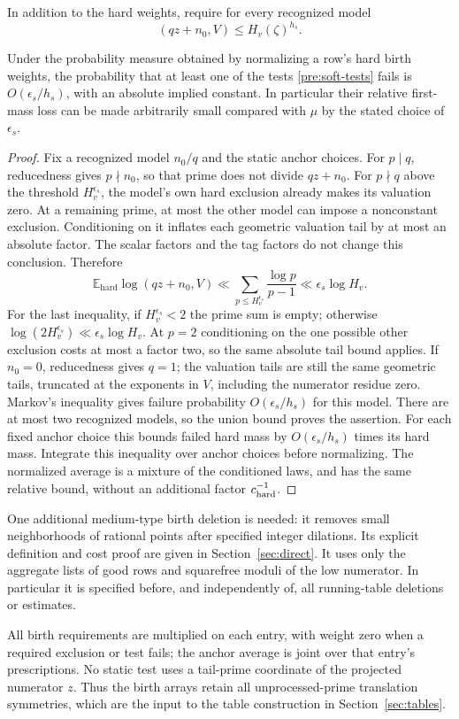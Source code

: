 In addition to the hard weights, require for every recognized model
\begin{equation}
 (qz+n_0,V)\le H_v(\zeta)^{h_s}.
 \label{pre:soft-tests}
\end{equation}

\begin{lemma}
\label{pre:soft-loss}
Under the probability measure obtained by normalizing a row's
hard birth weights, the probability that at least one of the tests
\eqref{pre:soft-tests} fails is $O(\epsilon_s/h_s)$, with an absolute
implied constant. In particular their relative first-mass loss can
be made arbitrarily small compared with $\mu$ by the stated
choice of $\epsilon_s$.
\end{lemma}

\begin{proof}
Fix a recognized model $n_0/q$ and the static anchor choices.
For $p\mid q$, reducedness gives $p\nmid n_0$, so that prime does
not divide $qz+n_0$. For $p\nmid q$ above the threshold
$H_v^{\epsilon_s}$, the model's own hard exclusion already makes
its valuation zero. At a remaining prime, at most the other
model can impose a nonconstant exclusion. Conditioning on it
inflates each geometric valuation tail by at most an absolute
factor. The scalar factors and the tag factors do not change
this conclusion. Therefore
\[
 \mathbb E_{\mathrm{hard}}\log(qz+n_0,V)
 \ll\sum_{p\le H_v^{\epsilon_s}}\frac{\log p}{p-1}
\ll\epsilon_s\log H_v.
\]
For the last inequality, if $H_v^{\epsilon_s}<2$ the prime sum
is empty; otherwise $\log(2H_v^{\epsilon_s})\ll
\epsilon_s\log H_v$. At $p=2$ conditioning on the one possible
other exclusion costs at most a factor two, so the same absolute
tail bound applies. If $n_0=0$, reducedness gives $q=1$; the
valuation tails are still the same geometric tails, truncated at
the exponents in $V$, including the numerator residue zero.
Markov's inequality gives failure probability
$O(\epsilon_s/h_s)$ for this model. There are at most two
recognized models, so the union bound proves the assertion.
For each fixed anchor choice this bounds failed hard mass by
$O(\epsilon_s/h_s)$ times its hard mass. Integrate this inequality
over anchor choices before normalizing. The normalized average
is a mixture of the conditioned laws, and has the same relative
bound, without an additional factor $c_{\rm hard}^{-1}$.
\end{proof}

One additional medium-type birth deletion is needed: it removes
small neighborhoods of rational points after specified integer
dilations. Its explicit definition and cost proof are given in
Section~\ref{sec:direct}. It uses only the aggregate lists of good
rows and squarefree moduli of the low numerator. In particular it
is specified before, and independently of, all running-table
deletions or estimates.

All birth requirements are multiplied on each entry, with weight
zero when a required exclusion or test fails; the anchor average
is joint over that entry's prescriptions. No static test uses a
tail-prime coordinate of the projected numerator $z$. Thus the
birth arrays retain all unprocessed-prime translation symmetries,
which are the input to the table construction in
Section~\ref{sec:tables}.
